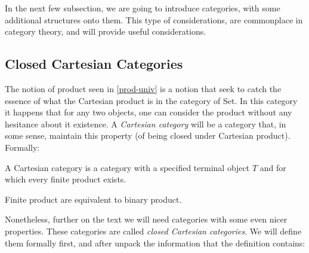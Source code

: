 In the next few subsection, we are going to introduce categories, with some additional structures onto them. This type of considerations, are commonplace in category theory, and will provide useful considerations.




\subsection{Closed Cartesian Categories}\label{subsect:CCC}

The notion of product seen in \ref{prod-univ} is a notion that seek to catch the essence of what the Cartesian product is in the category of Set. In this category it happens that for any two objects, one can consider the product without any hesitance about it existence. A \emph{Cartesian category} will be a category that, in some sense, maintain this property (of being closed under Cartesian product). Formally: 
\begin{definition}
  A Cartesian category is a category with a specified terminal object $T$ and for which every finite product exists.
\end{definition}
\begin{remark}
  Finite product are equivalent to binary product.
\end{remark}

Nonetheless, further on the text we will need categories with some even nicer properties. These categories are called \emph{closed Cartesian categories}. We will define them formally first, and after unpack the information that the definition contains:

